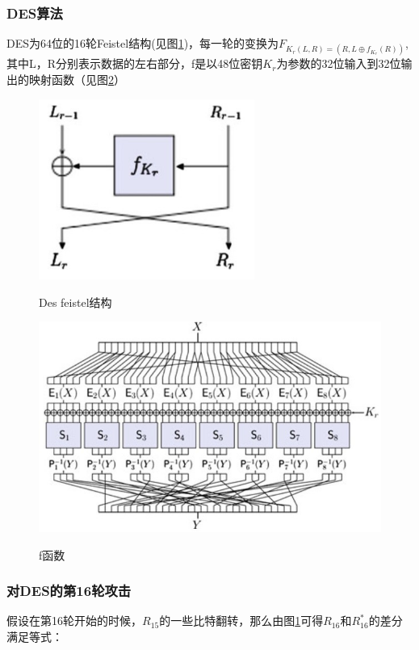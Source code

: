 \documentclass[a4paper,12pt]{article}
\begin{document}
\begin{CJK}{UTF8}{gkai}
\subsubsection{DES算法}
DES为64位的16轮Feistel结构(见图\ref{des_feistel})，每一轮的变换为$F_{K_r(L,R)=(R,L \oplus f_{K_r}(R))}$,其中L，R分别表示数据的左右部分，f是以48位密钥$K_r$为参数的32位输入到32位输出的映射函数（见图\ref{des_f_function}）
\begin{figure}
\centering
\caption{Des feistel结构}
\includegraphics[width=200pt]{Feistel.jpg}
\label{des_feistel}
\end{figure}

\begin{figure}
\centering
\caption{f函数}
\includegraphics[width=400pt]{des_f_function.jpg}
\label{des_f_function}
\end{figure}


\subsubsection{对DES的第16轮攻击}
假设在第16轮开始的时候，$R_{15}$的一些比特翻转，那么由图\ref{des_feistel}可得$R_{16}$和$R_{16}^*$的差分满足等式：


\end{CJK}
\end{document}
